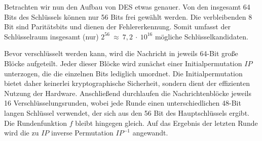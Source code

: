 Betrachten wir nun den Aufbau von DES etwas genauer. Von den insgesamt 64 Bits des Schlüssels können nur 56 Bits frei gewählt werden. Die verbleibenden 8 Bit sind Paritätsbits und dienen der Fehlererkennung. Somit umfasst der Schlüsselraum insgesamt (nur) $2^{56}~\approx~7,2~\cdot~10^{16}$ mögliche Schlüsselkandidaten.

Bevor verschlüsselt werden kann, wird die Nachricht in jeweils 64-Bit große Blöcke aufgeteilt. Jeder dieser Blöcke wird zunächst einer Initialpermutation $IP$ unterzogen, die die einzelnen Bits lediglich umordnet. Die Initialpermutation bietet daher keinerlei kryptographische Sicherheit, sondern dient der effizienten Nutzung der Hardware. Anschließend durchlaufen die Nachrichtenblöcke jeweils 16 Verschlüsselungsrunden, wobei jede Runde  einen unterschiedlichen 48-Bit langen Schlüssel verwendet, der sich aus den 56 Bit des Hauptschlüssels ergibt. Die Rundenfunktion $f$ bleibt hingegen gleich. Auf das Ergebnis der letzten Runde wird die zu $IP$ inverse Permutation $IP^{-1}$ angewandt.

